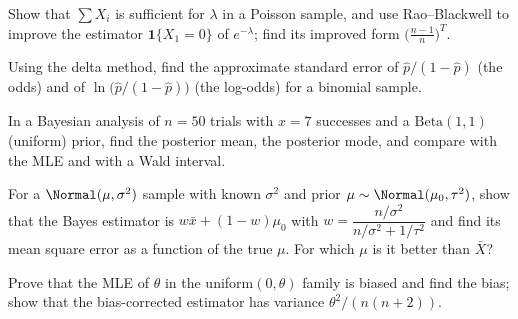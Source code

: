 \begin{exercise}
Show that $\sum X_i$ is sufficient for $\lambda$ in a Poisson sample, and use Rao--Blackwell to improve the estimator $\mathbf{1}\{X_1=0\}$ of $e^{-\lambda}$; find its improved form $\big(\frac{n-1}n\big)^{T}$.
\end{exercise}

\begin{exercise}
Using the delta method, find the approximate standard error of $\hat{p}/(1-\hat{p})$ (the odds) and of $\ln\big(\hat{p}/(1-\hat{p})\big)$ (the log-odds) for a binomial sample.
\end{exercise}

\begin{exercise}
In a Bayesian analysis of $n=50$ trials with $x=7$ successes and a $\mathrm{Beta}(1,1)$ (uniform) prior, find the posterior mean, the posterior mode, and compare with the MLE and with a Wald interval.
\end{exercise}

\begin{exercise}
For a $\Normal(\mu,\sigma^2)$ sample with known $\sigma^2$ and prior $\mu\sim\Normal(\mu_0,\tau^2)$, show that the Bayes estimator is $w\bar{x}+(1-w)\mu_0$ with $w=\dfrac{n/\sigma^2}{n/\sigma^2+1/\tau^2}$ and find its mean square error as a function of the true $\mu$. For which $\mu$ is it better than $\bar{X}$?
\end{exercise}

\begin{exercise}
Prove that the MLE of $\theta$ in the uniform$(0,\theta)$ family is biased and find the bias; show that the bias-corrected estimator has variance $\theta^2/(n(n+2))$.
\end{exercise}
